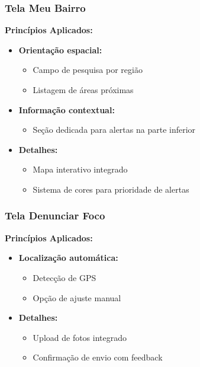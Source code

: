\documentclass[a4paper, 12pt]{article}
\begin{document}
\subsubsection{Tela Meu Bairro}
\textbf{Princípios Aplicados:}
\begin{itemize}[leftmargin=*]
    \item \textbf{Orientação espacial:}
    \begin{itemize}
        \item Campo de pesquisa por região
        \item Listagem de áreas próximas
    \end{itemize}
    
    \item \textbf{Informação contextual:}
    \begin{itemize}
        \item Seção dedicada para alertas na parte inferior
    \end{itemize}

    \item \textbf{Detalhes:}
    \begin{itemize}
        \item Mapa interativo integrado
        \item Sistema de cores para prioridade de alertas
    \end{itemize}
\end{itemize}

\subsubsection{Tela Denunciar Foco}
\textbf{Princípios Aplicados:}
\begin{itemize}[leftmargin=*]
    \item \textbf{Localização automática:}
    \begin{itemize}
        \item Detecção de GPS
        \item Opção de ajuste manual
    \end{itemize}

    \item \textbf{Detalhes:}
    \begin{itemize}
        \item Upload de fotos integrado
        \item Confirmação de envio com feedback
    \end{itemize}
\end{itemize}
\end{document}
